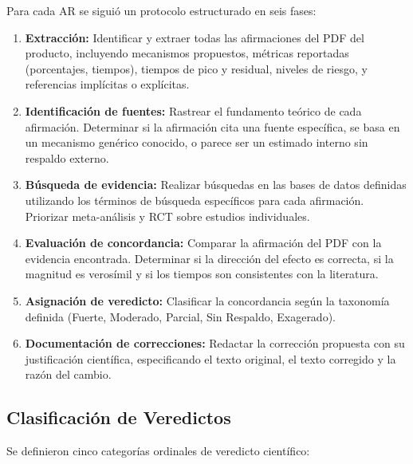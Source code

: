 \documentclass[12pt,a4paper]{article}
\begin{document}
Para cada AR se siguió un protocolo estructurado en seis fases:

\begin{enumerate}[itemsep=2pt]
    \item \textbf{Extracción:} Identificar y extraer todas las afirmaciones del
          PDF del producto, incluyendo mecanismos propuestos, métricas reportadas
          (porcentajes, tiempos), tiempos de pico y residual, niveles de riesgo,
          y referencias implícitas o explícitas.
    \item \textbf{Identificación de fuentes:} Rastrear el fundamento teórico de
          cada afirmación. Determinar si la afirmación cita una fuente específica,
          se basa en un mecanismo genérico conocido, o parece ser un estimado
          interno sin respaldo externo.
    \item \textbf{Búsqueda de evidencia:} Realizar búsquedas en las bases de datos
          definidas utilizando los términos de búsqueda específicos para cada
          afirmación. Priorizar meta-análisis y RCT sobre estudios individuales.
    \item \textbf{Evaluación de concordancia:} Comparar la afirmación del PDF
          con la evidencia encontrada. Determinar si la dirección del efecto es
          correcta, si la magnitud es verosímil y si los tiempos son consistentes
          con la literatura.
    \item \textbf{Asignación de veredicto:} Clasificar la concordancia según la
          taxonomía definida (Fuerte, Moderado, Parcial, Sin Respaldo, Exagerado).
    \item \textbf{Documentación de correcciones:} Redactar la corrección propuesta
          con su justificación científica, especificando el texto original, el
          texto corregido y la razón del cambio.
\end{enumerate}

\subsection{Clasificación de Veredictos}

Se definieron cinco categorías ordinales de veredicto científico:
\end{document}
